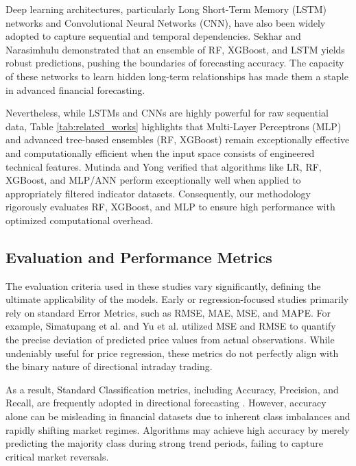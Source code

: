 \documentclass{ieeeaccess}
\begin{document}
Deep learning architectures, particularly Long Short-Term Memory (LSTM) networks and Convolutional Neural Networks (CNN), have also been widely adopted to capture sequential and temporal dependencies. Sekhar and Narasimhulu \cite{sekhar2025stock} demonstrated that an ensemble of RF, XGBoost, and LSTM yields robust predictions, pushing the boundaries of forecasting accuracy. The capacity of these networks to learn hidden long-term relationships has made them a staple in advanced financial forecasting.

Nevertheless, while LSTMs and CNNs are highly powerful for raw sequential data, Table \ref{tab:related_works} highlights that Multi-Layer Perceptrons (MLP) and advanced tree-based ensembles (RF, XGBoost) remain exceptionally effective and computationally efficient when the input space consists of engineered technical features. Mutinda and Yong \cite{mutinda2026hybrid} verified that algorithms like LR, RF, XGBoost, and MLP/ANN perform exceptionally well when applied to appropriately filtered indicator datasets. Consequently, our methodology rigorously evaluates RF, XGBoost, and MLP to ensure high performance with optimized computational overhead.

\subsection{Evaluation and Performance Metrics}

The evaluation criteria used in these studies vary significantly, defining the ultimate applicability of the models. Early or regression-focused studies primarily rely on standard Error Metrics, such as RMSE, MAE, MSE, and MAPE. For example, Simatupang et al. \cite{simatupang2026stock} and Yu et al. \cite{yu2025multi} utilized MSE and RMSE to quantify the precise deviation of predicted price values from actual observations. While undeniably useful for price regression, these metrics do not perfectly align with the binary nature of directional intraday trading.

As a result, Standard Classification metrics, including Accuracy, Precision, and Recall, are frequently adopted in directional forecasting \cite{sekhar2025stock, bareket2024adaptive}. However, accuracy alone can be misleading in financial datasets due to inherent class imbalances and rapidly shifting market regimes. Algorithms may achieve high accuracy by merely predicting the majority class during strong trend periods, failing to capture critical market reversals.
\end{document}
